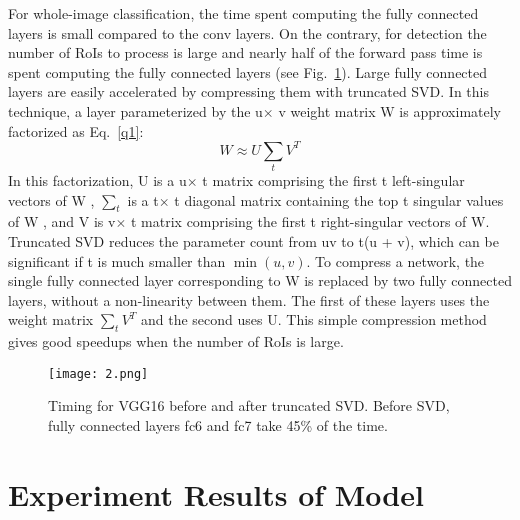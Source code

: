 \documentclass[10pt,twocolumn,letterpaper]{article}
\begin{document}
For whole-image classification, the time spent computing the fully connected layers is small compared to the conv layers. On the contrary, for detection the number of RoIs to process is large and nearly half of the forward pass time is spent computing the fully connected layers (see Fig.~\ref{p2}). Large fully connected layers are easily accelerated by compressing them with truncated SVD. In this technique, a layer parameterized by the u$\times$ v weight matrix W is approximately factorized as Eq.~\ref{q1}:
\begin{equation}
W \approx U\sum_t V^T \label{q1}
\end{equation}
In this factorization, U is a u$\times$ t matrix comprising the first t left-singular vectors of W , $\sum_t$ is a t$\times$ t diagonal matrix containing the top t singular values of W , and V is v$\times$ t matrix comprising the first t right-singular vectors of W. Truncated SVD reduces the parameter count from uv to t(u + v), which can be significant if t is much smaller than $\min(u, v)$. To compress a network, the single fully connected layer corresponding to W is replaced by two fully connected layers, without a non-linearity between them. The first of these layers uses the weight matrix $\sum_t V^T$ and the second uses U. This simple compression method gives good speedups when the number of RoIs is large.

\begin{figure}
	\begin{center}
		\texttt{[image: 2.png]}
	\end{center}
	\caption{Timing for VGG16 before and after truncated SVD. Before SVD, fully connected layers fc6 and fc7 take 45\% of the time.}
	\label{p2}
\end{figure}

\section{Experiment Results of Model}
\end{document}
